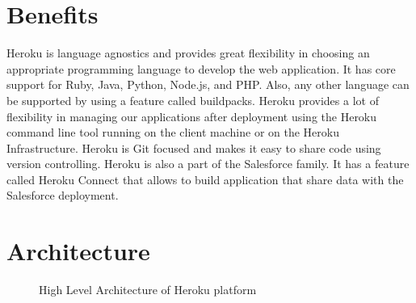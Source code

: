 \documentclass[9pt,twocolumn,twoside]{../../styles/osajnl}
\begin{document}
\section{Benefits}
	Heroku is language agnostics and provides great flexibility in choosing an
	appropriate programming language to develop the web application. It has core
	support for Ruby, Java, Python, Node.js, and PHP.  Also, any other language can
	be supported by using a feature called buildpacks. Heroku provides a lot of
	flexibility in managing our applications after deployment using the Heroku
	command line tool running on the client machine or on the Heroku Infrastructure.
	Heroku is  Git\cite{Git} focused  and makes it easy to share code using version
	controlling.  Heroku is also a part of the Salesforce family.  It has a feature
	called Heroku Connect that allows to build application that share data with the
	Salesforce deployment.

\section{Architecture}
	\begin{figure}[htbp]
		\centering
		\caption{High Level Architecture of Heroku platform }
		\label{fig:Herokul-arch}
	\end{figure}

        
\end{document}
